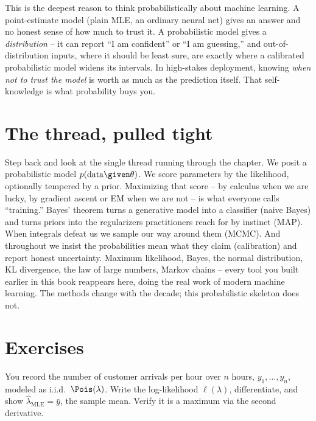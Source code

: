 \begin{aestheticbox}
This is the deepest reason to think probabilistically about machine learning.
A point-estimate model (plain MLE, an ordinary neural net) gives an answer and no
honest sense of how much to trust it. A probabilistic model gives a
\emph{distribution} -- it can report ``I am confident'' or ``I am guessing,'' and
out-of-distribution inputs, where it should be least sure, are exactly where a
calibrated probabilistic model widens its intervals. In high-stakes deployment,
knowing \emph{when not to trust the model} is worth as much as the prediction
itself. That self-knowledge is what probability buys you.
\end{aestheticbox}

\section{The thread, pulled tight}

Step back and look at the single thread running through the chapter. We posit a
probabilistic model $p(\text{data}\given\theta)$. We score parameters by the
likelihood, optionally tempered by a prior. Maximizing that score -- by calculus
when we are lucky, by gradient ascent or EM when we are not -- is what everyone
calls ``training.'' Bayes' theorem turns a generative model into a classifier
(naive Bayes) and turns priors into the regularizers practitioners reach for by
instinct (MAP). When integrals defeat us we sample our way around them (MCMC).
And throughout we insist the probabilities mean what they claim (calibration) and
report honest uncertainty. Maximum likelihood, Bayes, the normal distribution,
KL divergence, the law of large numbers, Markov chains -- every tool you built
earlier in this book reappears here, doing the real work of modern machine
learning. The methods change with the decade; this probabilistic skeleton does
not.

\section*{Exercises}

\begin{exercise}
You record the number of customer arrivals per hour over $n$ hours,
$y_1,\dots,y_n$, modeled as i.i.d.\ $\Pois(\lambda)$. Write the log-likelihood
$\ell(\lambda)$, differentiate, and show $\hat\lambda_{\text{MLE}} = \bar y$, the
sample mean. Verify it is a maximum via the second derivative.
\end{exercise}

